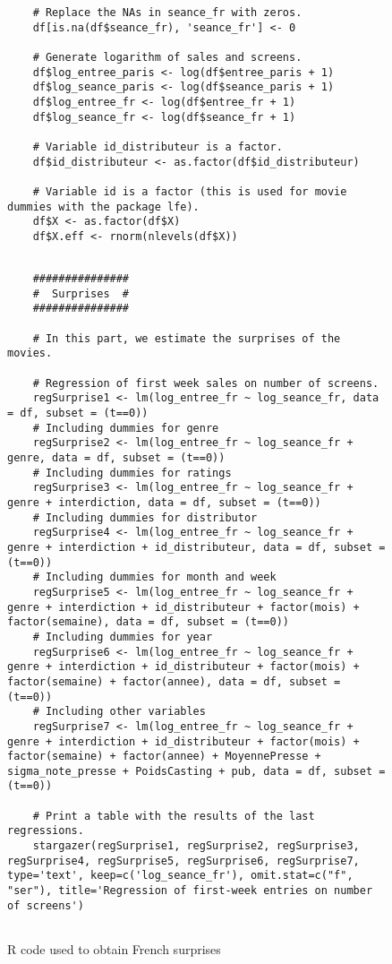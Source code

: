 \documentclass{article}
\begin{document}
\begin{appendices}
\begin{figure}[H]
\begin{lstlisting}
	# Replace the NAs in seance_fr with zeros.
	df[is.na(df$seance_fr), 'seance_fr'] <- 0
	
	# Generate logarithm of sales and screens.
	df$log_entree_paris <- log(df$entree_paris + 1)
	df$log_seance_paris <- log(df$seance_paris + 1)
	df$log_entree_fr <- log(df$entree_fr + 1)
	df$log_seance_fr <- log(df$seance_fr + 1)
	
	# Variable id_distributeur is a factor.
	df$id_distributeur <- as.factor(df$id_distributeur)
	
	# Variable id is a factor (this is used for movie dummies with the package lfe).
	df$X <- as.factor(df$X)
	df$X.eff <- rnorm(nlevels(df$X))
	
	\end{lstlisting}
\end{figure}
\begin{figure}[H]
	\caption{R code used to obtain French surprises}
	\label{code_french_surprises}
	\begin{lstlisting}
	###############
	#  Surprises  #
	###############
	
	# In this part, we estimate the surprises of the movies.
	
	# Regression of first week sales on number of screens.
	regSurprise1 <- lm(log_entree_fr ~ log_seance_fr, data = df, subset = (t==0))
	# Including dummies for genre
	regSurprise2 <- lm(log_entree_fr ~ log_seance_fr + genre, data = df, subset = (t==0))
	# Including dummies for ratings 
	regSurprise3 <- lm(log_entree_fr ~ log_seance_fr + genre + interdiction, data = df, subset = (t==0))
	# Including dummies for distributor 
	regSurprise4 <- lm(log_entree_fr ~ log_seance_fr + genre + interdiction + id_distributeur, data = df, subset = (t==0))
	# Including dummies for month and week 
	regSurprise5 <- lm(log_entree_fr ~ log_seance_fr + genre + interdiction + id_distributeur + factor(mois) + factor(semaine), data = df, subset = (t==0))
	# Including dummies for year 
	regSurprise6 <- lm(log_entree_fr ~ log_seance_fr + genre + interdiction + id_distributeur + factor(mois) + factor(semaine) + factor(annee), data = df, subset = (t==0))
	# Including other variables
	regSurprise7 <- lm(log_entree_fr ~ log_seance_fr + genre + interdiction + id_distributeur + factor(mois) + factor(semaine) + factor(annee) + MoyennePresse + sigma_note_presse + PoidsCasting + pub, data = df, subset = (t==0))
	
	# Print a table with the results of the last regressions.
	stargazer(regSurprise1, regSurprise2, regSurprise3, regSurprise4, regSurprise5, regSurprise6, regSurprise7, type='text', keep=c('log_seance_fr'), omit.stat=c("f", "ser"), title='Regression of first-week entries on number of screens')
	

\end{lstlisting}
\end{figure}
\end{appendices}
\end{document}
